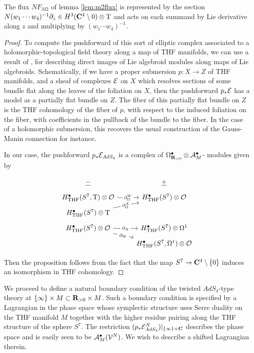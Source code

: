 \documentclass[../main.tex]{subfiles}
\begin{document}
The flux $NF_{M2}$ of lemma \ref{lem:m2flux} is represented by the section $N (w_1\cdots w_4)^{-1}\partial_z \in H^3 (\mathbf{C}^4\setminus 0)\otimes {\mathrm{T}}$ and acts on each summand by Lie derivative along $z$ and multiplying by $(w_1\cdots w_4)^{-1}$.

\begin{proof}
To compute the pushforward of this sort of elliptic complex associated to a holomorphic-topological field theory along a map of THF manifolds, we can use a result of \cite[section 4.2]{KormanThesis}, \cite{KamberTondeur} for describing direct images of Lie algebroid modules along maps of Lie algebroids. Schematically, if we have a proper submersion $p : X\to Z$ of THF manifolds, and a sheaf of complexes $\mathcal{E}$ on $X$ which resolves sections of some bundle flat along the leaves of the foliation on $X$, then the pushforward $p_*\mathcal{E}$ has a model as a partially flat bundle on $Z$. The fiber of this partially flat bundle on $Z$ is the THF cohomology of the fiber of $p$, with respect to the induced foliation on the fiber, with coefficients in the pullback of the bundle to the fiber. In the case of a holomorphic submersion, this recovers the usual construction of the Gauss-Manin connection for instance. 

In our case, the pushforward $p_* \mathcal{E}_{AdS_4}$ is a complex of $\Omega^\bullet_{\mathbf{R}_{>0}} \otimes \mathcal A^\bullet_M$- modules given by 

\begin{equation}
  \label{eqn:ads4ss} 
  \begin{tikzcd}[row sep = 1 ex]
    \ul{-} & \ul{+} \\ 
H^\bullet_{\mr{THF}}(S^7, \T) \otimes \mc{O}\ar[r, "\del^W_\Omega" description] & H^\bullet_{\mr{THF}} (S^7) \otimes \mc O \\
H^\bullet_{\mr{THF}} (S^7)  \otimes \T\ar[ur, "\del^X_\Omega" description] \\
H^\bullet_{\mr{THF}} (S^7)\otimes \mc{O}\ar[r, "\del_X" description]\ar[dr, "\del_W" description] & H^\bullet_{\mr{THF}} (S^7) \otimes \Omega^1
 \\ & H^\bullet_{\mr{THF}} (S^7, \Omega^1)  \otimes \mc O
 \end{tikzcd}
\end{equation}

Then the proposition follows from the fact that the map $S^7\to \mathbf{C}^4\setminus \{0\}$ induces an isomorphism in THF cohomology.
\end{proof}

\parsec{}
We proceed to define a natural boundary condition of the twisted $AdS_4$-type theory at $\{\infty\} \times M \subset \mathbf{R}_{>0} \times M$. 
Such a boundary condition is specified by a Lagrangian in the phase space whose symplectic structure uses Serre duality on the THF manifold $M$ together with the higher residue pairing along the THF structure of the sphere $S^7$. 
The restriction $(p_* \mathcal{E}^N_{AdS_4})|_{\{\infty\}\times \mathbf{C}}$ describes the phase space and is easily seen to be $\mathcal A_M^\bullet (\mathcal{V}^N)$. We wish to describe a shifted Lagrangian therein.
\end{document}
